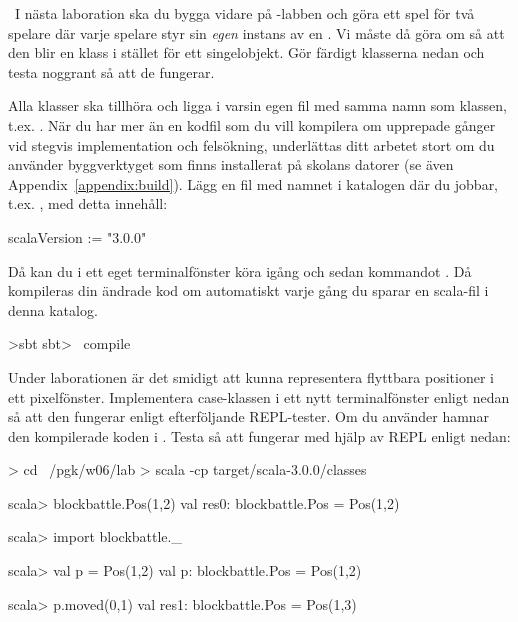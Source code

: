\QUESTBEGIN

\Task\label{exe:classes:labprep}  \what~I nästa laboration ska du bygga vidare på -labben och göra ett spel för två spelare där varje spelare styr sin \emph{egen} instans av en . Vi måste då göra om  så att den blir en klass i stället för ett singelobjekt. Gör färdigt klasserna nedan och testa noggrant så att de fungerar. 

Alla klasser ska tillhöra  och ligga i varsin egen fil med samma namn som klassen, t.ex. . När du har mer än en kodfil som du vill kompilera om upprepade gånger vid stegvis implementation och felsökning, underlättas ditt arbetet stort om du använder byggverktyget  som finns installerat på skolans datorer (se även Appendix~\ref{appendix:build}). Lägg en fil med namnet  i katalogen där du jobbar, t.ex. , med detta innehåll:
\begin{Code}
scalaVersion := "3.0.0"
\end{Code}
Då kan du i ett eget terminalfönster köra igång  och sedan kommandot . Då kompileras din ändrade kod om automatiskt varje gång du sparar en scala-fil i denna katalog.
\begin{REPLnonum}
>sbt
sbt> ~compile
\end{REPLnonum}

\Subtask Under laborationen är det smidigt att kunna representera flyttbara positioner i ett pixelfönster. Implementera case-klassen  i ett nytt terminalfönster enligt nedan så att den fungerar enligt efterföljande REPL-tester.
Om du använder  hamnar den kompilerade koden i . Testa så att  fungerar med hjälp av REPL enligt nedan:
\begin{REPL}
> cd ~/pgk/w06/lab
> scala -cp target/scala-3.0.0/classes

scala> blockbattle.Pos(1,2)
val res0: blockbattle.Pos = Pos(1,2)

scala> import blockbattle._

scala> val p = Pos(1,2)
val p: blockbattle.Pos = Pos(1,2)

scala> p.moved(0,1)
val res1: blockbattle.Pos = Pos(1,3)
\end{REPL}


